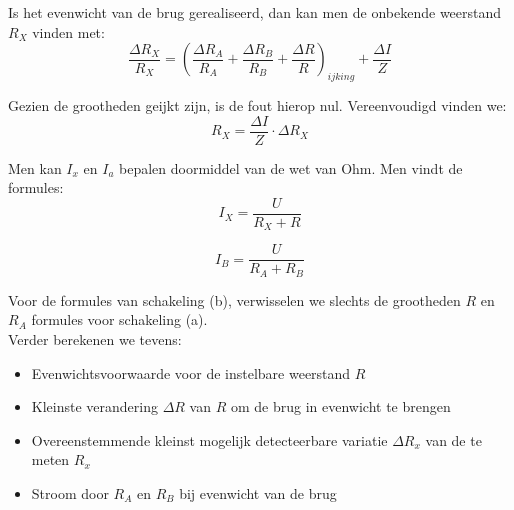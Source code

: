 Is het evenwicht van de brug gerealiseerd, dan kan men de onbekende weerstand $R_X$ vinden met:
\\

\begin{equation}
    \frac{\Delta R_X}{R_X} = (\frac{\Delta R_A}{R_A} + \frac{\Delta R_B}{R_B} + \frac{\Delta R}{R})_{ijking}
    + \frac{\Delta I}{Z}
\end{equation}

Gezien de grootheden geijkt zijn, is de fout hierop nul. Vereenvoudigd vinden we:
\\

\begin{equation}
    R_X = \frac{\Delta I}{Z} \cdot \Delta R_X
\end{equation}

Men kan $I_x$ en $I_a$ bepalen doormiddel van de wet van Ohm.
Men vindt de formules:
\\

\begin{equation}
    I_X = \frac{U}{R_{X} + R}
\end{equation}

\begin{equation}
    I_B = \frac{U}{R_{A} + R_{B}}
\end{equation}

Voor de formules van schakeling (b), verwisselen we slechts de grootheden $R$ en $R_A$ 
formules voor schakeling (a).
\\

Verder berekenen we tevens:
\begin{itemize}
    \item Evenwichtsvoorwaarde voor de instelbare weerstand $R$
    \item Kleinste verandering $\Delta R$ van $R$ om de brug in evenwicht te brengen
    \item Overeenstemmende kleinst mogelijk detecteerbare variatie $\Delta R_x$ van de te meten $R_x$ 
    \item Stroom door $R_A$ en $R_B$ bij evenwicht van de brug
\end{itemize}

